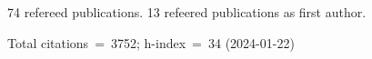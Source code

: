 74 refereed publications. 13 refeered publications as first author.

Total citations~=~3752; h-index~=~34 (2024-01-22)